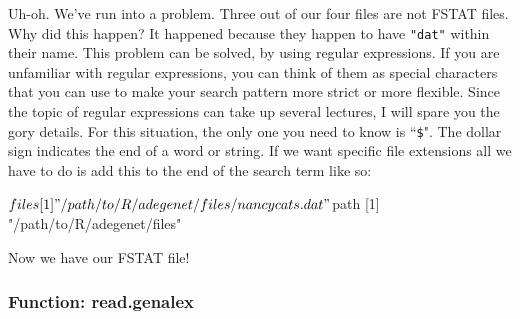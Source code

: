 \documentclass[letterpaper]{article}
\begin{document}
Uh-oh. We've run into a problem. Three out of our four files are not FSTAT files. Why did this happen? It happened because they happen to have \texttt{"dat"} within their name. This problem can be solved, by using regular expressions. If you are unfamiliar with regular expressions, you can think of them as special characters that you can use to make your search pattern more strict or more flexible. Since the topic of regular expressions can take up several lectures, I will spare you the gory details. For this situation, the only one you need to know is ``\texttt{\$}". The dollar sign indicates the end of a word or string. If we want specific file extensions all we have to do is add this to the end of the search term like so:
\begin{Schunk}
\end{Schunk}
\begin{Schunk}
\begin{Soutput}
$files
[1] "/path/to/R/adegenet/files/nancycats.dat"

$path
[1] "/path/to/R/adegenet/files"
\end{Soutput}
\end{Schunk}
Now we have our FSTAT file!
\subsubsection{Function: read.genalex}\label{intro:import:read.genalex}
\end{document}
